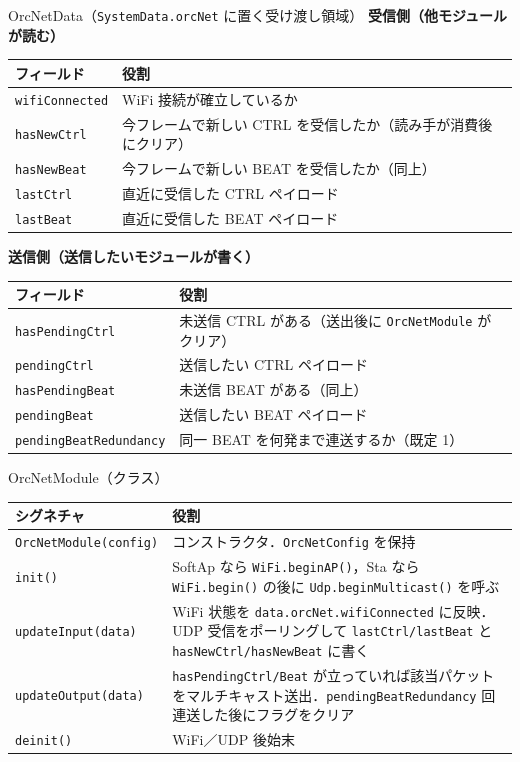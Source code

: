\documentclass[lualatex,book,paper=a4paper,jafontsize=11.5pt,jafontscale=1.05]{jlreq}
\begin{document}
\begin{apibox}{OrcNetData（\texttt{SystemData.orcNet} に置く受け渡し領域）}
\textbf{受信側（他モジュールが読む）}\\[2pt]
\begin{tabular}{l p{}}
\toprule
\textbf{フィールド} & \textbf{役割} \\
\midrule
\texttt{wifiConnected} & WiFi 接続が確立しているか \\
\texttt{hasNewCtrl}    & 今フレームで新しい CTRL を受信したか（読み手が消費後にクリア） \\
\texttt{hasNewBeat}    & 今フレームで新しい BEAT を受信したか（同上） \\
\texttt{lastCtrl}      & 直近に受信した CTRL ペイロード \\
\texttt{lastBeat}      & 直近に受信した BEAT ペイロード \\
\bottomrule
\end{tabular}

\medskip
\textbf{送信側（送信したいモジュールが書く）}\\[2pt]
\begin{tabular}{l p{}}
\toprule
\textbf{フィールド} & \textbf{役割} \\
\midrule
\texttt{hasPendingCtrl}        & 未送信 CTRL がある（送出後に \texttt{OrcNetModule} がクリア） \\
\texttt{pendingCtrl}           & 送信したい CTRL ペイロード \\
\texttt{hasPendingBeat}        & 未送信 BEAT がある（同上） \\
\texttt{pendingBeat}           & 送信したい BEAT ペイロード \\
\texttt{pendingBeatRedundancy} & 同一 BEAT を何発まで連送するか（既定 1） \\
\bottomrule
\end{tabular}
\end{apibox}

\begin{apibox}{OrcNetModule（クラス）}
\begin{tabular}{l p{}}
\toprule
\textbf{シグネチャ} & \textbf{役割} \\
\midrule
\texttt{OrcNetModule(config)} & コンストラクタ．\texttt{OrcNetConfig} を保持 \\
\texttt{init()}               & SoftAp なら \texttt{WiFi.beginAP()}，Sta なら \texttt{WiFi.begin()} の後に \texttt{Udp.beginMulticast()} を呼ぶ \\
\texttt{updateInput(data)}    & WiFi 状態を \texttt{data.orcNet.wifiConnected} に反映．UDP 受信をポーリングして \texttt{lastCtrl/lastBeat} と \texttt{hasNewCtrl/hasNewBeat} に書く \\
\texttt{updateOutput(data)}   & \texttt{hasPendingCtrl/Beat} が立っていれば該当パケットをマルチキャスト送出．\texttt{pendingBeatRedundancy} 回連送した後にフラグをクリア \\
\texttt{deinit()}             & WiFi／UDP 後始末 \\
\bottomrule
\end{tabular}
\end{apibox}
\end{document}
